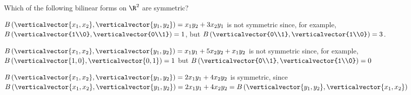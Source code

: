 \documentclass{ximera}
\begin{document}
\begin{question}
  Which of the following bilinear forms on $\R^2$ are symmetric?
  \begin{solution}
    \begin{hint}
      $B\left(\verticalvector{x_1,x_2},\verticalvector{y_1,y_2}\right) = x_1y_2+3x_2y_1$ is not symmetric since, for example,
      $B\left( \verticalvector{1\\0},\verticalvector{0\\1}\right) = 1$, but $B\left( \verticalvector{0\\1},\verticalvector{1\\0}\right) = 3$.
    \end{hint}
    \begin{hint}
      $B\left(\verticalvector{x_1,x_2},\verticalvector{y_1,y_2}\right) = x_1y_1+5x_2y_2+x_1y_2$ is not symmetric since, for example,
      $B\left(\verticalvector{1,0},\verticalvector{0,1}\right) = 1$ but  $B\left( \verticalvector{0\\1},\verticalvector{1\\0}\right) = 0$
    \end{hint}
    \begin{hint}
      $B\left(\verticalvector{x_1,x_2},\verticalvector{y_1,y_2}\right) = 2x_1y_1+4x_2y_2$ is symmetric, since
      $B\left(\verticalvector{x_1,x_2},\verticalvector{y_1,y_2}\right) = 2x_1y_1+4x_2y_2 = B\left(\verticalvector{y_1,y_2}, \verticalvector{x_1,x_2}\right) $
    \end{hint}
    \begin{multiple-choice}
    \end{multiple-choice}
  \end{solution}
\end{question}

\end{document}
